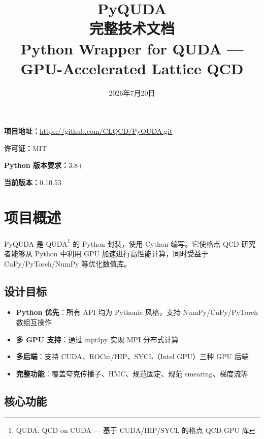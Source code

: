 \documentclass[12pt,a4paper]{ctexart}
\title{{\Huge\bfseries PyQUDA}\\[4pt]
       {\large 完整技术文档}\\[4pt]
       {\normalsize Python Wrapper for QUDA — GPU-Accelerated Lattice QCD}}
\author{}
\date{2026年7月20日}
\begin{document}
\maketitle
\thispagestyle{empty}

\vspace{2cm}
\begin{center}
\begin{tcolorbox}[width=0.85\textwidth,boxrule=0.8pt,colback=blue!3!white,colframe=blue!40!black]
\centering
\textbf{项目地址：}\url{https://github.com/CLQCD/PyQUDA.git}

\textbf{许可证：}MIT

\textbf{Python 版本要求：}3.8+

\textbf{当前版本：}0.10.53
\end{tcolorbox}
\end{center}

\newpage
\tableofcontents
\newpage

\section{项目概述}

PyQUDA 是 QUDA\footnote{QUDA: QCD on CUDA — 基于 CUDA/HIP/SYCL 的格点 QCD GPU 库} 的 Python 封装，使用 Cython 编写。它使格点 QCD 研究者能够从 Python 中利用 GPU 加速进行高性能计算，同时受益于 CuPy/PyTorch/NumPy 等优化数值库。

\subsection{设计目标}

\begin{itemize}[itemsep=3pt]
    \item \textbf{Python 优先}：所有 API 均为 Pythonic 风格，支持 NumPy/CuPy/PyTorch 数组互操作
    \item \textbf{多 GPU 支持}：通过 mpi4py 实现 MPI 分布式计算
    \item \textbf{多后端}：支持 CUDA、ROCm/HIP、SYCL（Intel GPU）三种 GPU 后端
    \item \textbf{完整功能}：覆盖夸克传播子、HMC、规范固定、规范 smearing、梯度流等
\end{itemize}

\subsection{核心功能}
\end{document}
